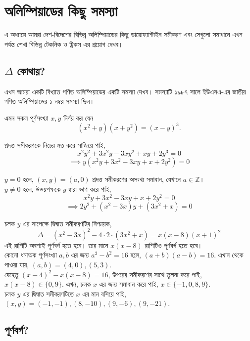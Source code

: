 \documentclass[11pt]{report}
\begin{document}
\chapter{অলিম্পিয়াডের কিছু সমস্যা}

এ অধ্যায়ে আমরা দেশ-বিদেশের বিভিন্ন অলিম্পিয়াডের কিছু ডায়োফ্যান্টাইন সমীকরণ এবং সেগুলো সমাধানে এখন পর্যন্ত শেখা বিভিন্ন টেকনিক ও ট্রিকস এর প্রয়োগ দেখব।\\

\section{$\Delta$ কোথায়?}

এখন আমরা একটি বিখ্যাত গণিত অলিম্পিয়াডের একটি সমস্যা দেখব। সমস্যাটি ১৯৮৭ সালে ইউএসএ-এর জাতীয় গণিত অলিম্পিয়াডের ১ নম্বর সমস্যা ছিল।\\

\begin{tcolorbox}[colframe=black!80!green,title=USAMO 1987]
এমন সকল পূর্ণসংখ্যা $x,y$ নির্ণয় কর যেন $$(x^2+y)(x+y^2)=(x-y)^3.$$
\end{tcolorbox}

প্রদত্ত সমীকরণকে নিচের মত করে সাজিয়ে পাই, $$x^2y^2+3x^2y-3xy^2+xy+2y^3=0$$ $$\implies y(x^2y+3x^2-3xy+x+2y^2)=0$$

$y=0$ হলে, $(x,y) = (a,0)$ প্রদত্ত সমীকরণের অসংখ্য সমাধান, যেখানে $a \in \mathbb{Z}$।\\

$y \not = 0$ হলে, উভয়পক্ষকে $y$ দ্বারা ভাগ করে পাই, $$x^2y+3x^2-3xy+x+2y^2=0$$ $$\implies 2y^2+(x^2-3x)y+(3x^2+x)=0$$

চলক $y$ এর সাপেক্ষে দ্বিঘাত সমীকরণটির নিশ্চায়ক, $$\Delta  = (x^2-3x)^2 - 4 \cdot 2 \cdot (3x^2+x)=x(x-8)(x+1)^2$$ এই রাশিটি অবশ্যই পূর্ণবর্গ হতে হবে। তার মানে $x(x-8)$ রাশিটিও পূর্ণবর্গ হতে হবে।\\

কোনো ধনাত্মক পূর্ণসংখ্যা $a,b$ এর জন্য $a^2-b^2=16$ হলে, $(a+b)(a-b)=16$. এখান থেকে পাওয়া যায়, $(a,b)=(4,0),(5,3)$.\\

যেহেতু $(x-4)^2-x(x-8)=16$, উপরের সমীকরণের সাথে তুলনা করে পাই, $x(x-8) \in \{0,9\}$. এখন, চলক $x$ এর জন্য সমাধান করে পাই, $x \in \{-1,0,8,9\}$.\\

চলক $y$ এর দ্বিঘাত সমীকরণটিতে $x$ এর মান বসিয়ে পাই, $(x,y)=(-1,-1),(8,-10),(9,-6),(9,-21).$\\

\section{পূর্ণবর্গ?}
\end{document}
